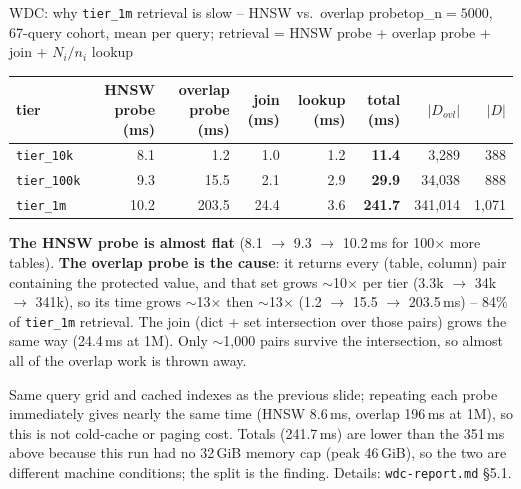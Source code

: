 \documentclass[aspectratio=169,10pt]{beamer}
\newcommand{\highlight}[1]{{\color{Cat1}\bfseries #1}}
\begin{document}
\begin{frame}{WDC: why \texttt{tier\_1m} retrieval is slow -- HNSW vs.\ overlap probe}{top\_n$=5000$, 67-query cohort, mean per query; retrieval = HNSW probe + overlap probe + join + $N_i/n_i$ lookup}
\footnotesize
\begin{center}
\setlength{\tabcolsep}{4pt}
\begin{tabular}{lrrrrrrr}
\toprule
tier & HNSW probe (ms) & overlap probe (ms) & join (ms) & lookup (ms) & \textbf{total (ms)} & $|D_{ovl}|$ & $|D|$ \\
\midrule
\texttt{tier\_10k}  & 8.1  & 1.2   & 1.0  & 1.2 & \textbf{11.4}  & 3{,}289   & 388 \\
\texttt{tier\_100k} & 9.3  & 15.5  & 2.1  & 2.9 & \textbf{29.9}  & 34{,}038  & 888 \\
\texttt{tier\_1m}   & 10.2 & 203.5 & 24.4 & 3.6 & \textbf{241.7} & 341{,}014 & 1{,}071 \\
\bottomrule
\end{tabular}
\end{center}
\vspace{3pt}
\highlight{The HNSW probe is almost flat} (8.1 $\to$ 9.3 $\to$ 10.2\,ms for 100$\times$ more tables). \highlight{The overlap probe is the cause}: it returns every (table, column) pair containing the protected value, and that set grows $\sim$10$\times$ per tier (3.3k $\to$ 34k $\to$ 341k), so its time grows $\sim$13$\times$ then $\sim$13$\times$ (1.2 $\to$ 15.5 $\to$ 203.5\,ms) -- 84\% of \texttt{tier\_1m} retrieval. The join (dict + set intersection over those pairs) grows the same way (24.4\,ms at 1M). Only $\sim$1{,}000 pairs survive the intersection, so almost all of the overlap work is thrown away.

\vspace{1pt}
{\footnotesize\color{Muted} Same query grid and cached indexes as the previous slide; repeating each probe immediately gives nearly the same time (HNSW 8.6\,ms, overlap 196\,ms at 1M), so this is not cold-cache or paging cost. Totals (241.7\,ms) are lower than the 351\,ms above because this run had no 32\,GiB memory cap (peak 46\,GiB), so the two are different machine conditions; the split is the finding. Details: \texttt{wdc-report.md} \S5.1.}
\end{frame}
\end{document}
